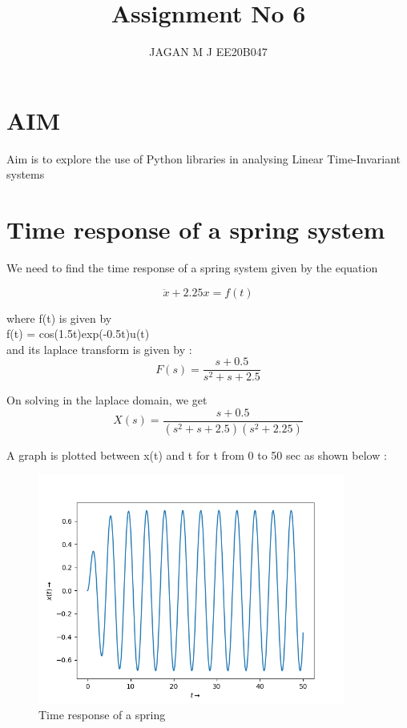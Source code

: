 \documentclass[10pt,a4paper]{article}
\date{}
\begin{document}
\title{Assignment No 6}
\author{JAGAN M J EE20B047}
\maketitle


\section{AIM}

Aim is to explore the use of Python libraries in analysing Linear Time-Invariant systems

\section{Time response of a spring system}
We need to find the time response of a spring system given by the equation 

$$ \ddot{x} + 2.25x = f(t)  $$

where f(t) is given by \\

f(t) = cos{(1.5t)}exp(-0.5t)u(t) \\

and its laplace transform is given by :
\[
    F(s) = \frac{s+0.5}{s^2 + s + 2.5}
\]

On solving in the laplace domain, we get 
\[
    X(s) = \frac{s+0.5}{(s^2 + s + 2.5)(s^2 + 2.25)}
\]

A graph is plotted between x(t) and t for t from 0 to 50 sec as shown below :

\begin{figure}[!tbh]

\includegraphics[width = 0.9\textwidth]{1.png}
\caption{Time response of a spring}

\end{figure}
\end{document}
